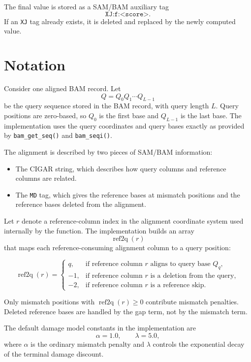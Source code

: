 \documentclass[11pt]{article}
\begin{document}
The final value is stored as a SAM/BAM auxiliary tag
\[
\texttt{XJ:f:<score>}.
\]
If an \texttt{XJ} tag already exists, it is deleted and replaced by the newly
computed value.

\section{Notation}

Consider one aligned BAM record. Let
\[
Q = Q_0 Q_1 \cdots Q_{L-1}
\]
be the query sequence stored in the BAM record, with query length $L$. Query
positions are zero-based, so $Q_0$ is the first base and $Q_{L-1}$ is the last
base. The implementation uses the query coordinates and query bases exactly as
provided by \texttt{bam\_get\_seq()} and \texttt{bam\_seqi()}.

The alignment is described by two pieces of SAM/BAM information:

\begin{itemize}
\item The CIGAR string, which describes how query columns and reference columns
are related.
\item The \texttt{MD} tag, which gives the reference bases at mismatch
positions and the reference bases deleted from the alignment.
\end{itemize}

Let $r$ denote a reference-column index in the alignment coordinate system used
internally by the function. The implementation builds an array
\[
\operatorname{ref2q}(r)
\]
that maps each reference-consuming alignment column to a query position:

\[
\operatorname{ref2q}(r) =
\begin{cases}
q, & \text{if reference column } r \text{ aligns to query base } Q_q,\\
-1, & \text{if reference column } r \text{ is a deletion from the query},\\
-2, & \text{if reference column } r \text{ is a reference skip}.
\end{cases}
\]

Only mismatch positions with $\operatorname{ref2q}(r) \ge 0$ contribute
mismatch penalties. Deleted reference bases are handled by the gap term, not by
the mismatch term.

The default damage model constants in the implementation are
\[
\alpha = 1.0, \qquad \lambda = 5.0,
\]
where $\alpha$ is the ordinary mismatch penalty and $\lambda$ controls the
exponential decay of the terminal damage discount.
\end{document}
